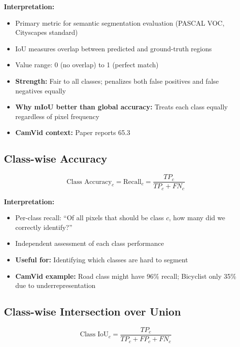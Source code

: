 \documentclass[11pt,a4paper]{report}
\begin{document}
\textbf{Interpretation:}
\begin{itemize}
  \item Primary metric for semantic segmentation evaluation (PASCAL VOC, Cityscapes standard)
  \item IoU measures overlap between predicted and ground-truth regions
  \item Value range: 0 (no overlap) to 1 (perfect match)
  \item \textbf{Strength:} Fair to all classes; penalizes both false positives and false negatives equally
  \item \textbf{Why mIoU better than global accuracy:} Treats each class equally regardless of pixel frequency
  \item \textbf{CamVid context:} Paper reports 65.3%
\end{itemize}

\subsection{Class-wise Accuracy}

\begin{equation}
\text{Class Accuracy}_c = \text{Recall}_c = \frac{TP_c}{TP_c + FN_c}
\end{equation}

\textbf{Interpretation:}
\begin{itemize}
  \item Per-class recall: ``Of all pixels that should be class $c$, how many did we correctly identify?''
  \item Independent assessment of each class performance
  \item \textbf{Useful for:} Identifying which classes are hard to segment
  \item \textbf{CamVid example:} Road class might have 96\% recall; Bicyclist only 35\% due to underrepresentation
\end{itemize}

\subsection{Class-wise Intersection over Union}

\begin{equation}
\text{Class IoU}_c = \frac{TP_c}{TP_c + FP_c + FN_c}
\end{equation}
\end{document}
